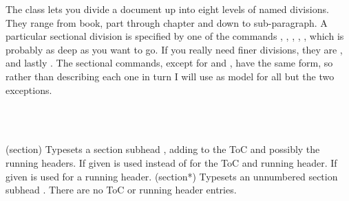     The \theclass{} class lets you divide a document up into eight levels
of named divisions. They range from book, part 
through chapter and down to 
sub-paragraph. A particular sectional division is specified by one of
the commands \cmd{\book}, \cmd{\part}, \cmd{\chapter}, \cmd{\section}, 
\cmd{\subsection},
which is probably as deep as you want to go. If you really need finer
divisions, they are
 \cmd{\subsubsection}, \cmd{\paragraph} and lastly \cmd{\subparagraph}.
The sectional commands, except for \cmd{\book} and \cmd{\part},
have the same form, so rather than describing 
each one in turn I will use \cmd{\section} as model for all but the
two exceptions.

\begin{syntax}
\cmd{\section}\\
\cmd{\section*}\\
\end{syntax} 
\glossary(section)%
  {}%
  {Typesets a section subhead , adding  to the ToC and 
   possibly the running headers. If given 
   is used instead of  for the ToC and running header. If given
    is used for a running header.}
\glossary(section*)%
  {}%
  {Typesets an unnumbered section subhead . There are no ToC or
   running header entries.}

